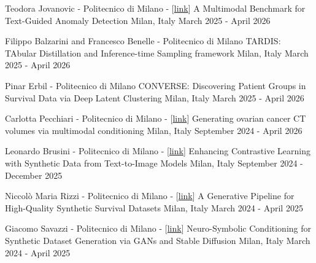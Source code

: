 \begin{cventries}

    \cventry
    {Teodora Jovanovic - Politecnico di Milano - [\href{https://www.politesi.polimi.it/handle/10589/252794}{link}]} %
    {A Multimodal Benchmark for Text-Guided Anomaly Detection} %
    {Milan, Italy} %
    {March 2025 - April 2026} %
    {}

    \vspace{-10pt}
    \cventry
    {Filippo Balzarini and Francesco Benelle - Politecnico di Milano} %
    {TARDIS: TAbular Distillation and Inference-time Sampling framework} %
    {Milan, Italy} %
    {March 2025 - April 2026} %
    {}

    \vspace{-10pt}
    \cventry
    {Pinar Erbil - Politecnico di Milano} %
    {CONVERSE: Discovering Patient Groups in Survival Data via Deep Latent Clustering} %
    {Milan, Italy} %
    {March 2025 - April 2026} %
    {}

    \vspace{-10pt}
    \cventry
    {Carlotta Pecchiari - Politecnico di Milano - [\href{https://www.politesi.polimi.it/handle/10589/246635}{link}]} %
    {Generating ovarian cancer CT volumes via multimodal conditioning} %
    {Milan, Italy} %
    {September 2024 - April 2026} %
    {}

    \vspace{-10pt}
    \cventry
    {Leonardo Brusini - Politecnico di Milano - [\href{https://www.politesi.polimi.it/handle/10589/246635}{link}]} %
    {Enhancing Contrastive Learning with Synthetic Data from Text-to-Image Models} %
    {Milan, Italy} %
    {September 2024 - December 2025} %
    {}

    \vspace{-10pt}
    \cventry
    {Niccolò Maria Rizzi - Politecnico di Milano - [\href{https://www.politesi.polimi.it/handle/10589/235504}{link}]} %
    {A Generative Pipeline for High-Quality Synthetic Survival Datasets} %
    {Milan, Italy} %
    {March 2024 - April 2025} %
    {}

    \vspace{-10pt}
    \cventry
    {Giacomo Savazzi - Politecnico di Milano - [\href{https://www.politesi.polimi.it/handle/10589/234573}{link}]} %
    {Neuro-Symbolic Conditioning for Synthetic Dataset Generation via GANs and Stable Diffusion} %
    {Milan, Italy} %
    {March 2024 - April 2025} %
    {}


\end{cventries}
